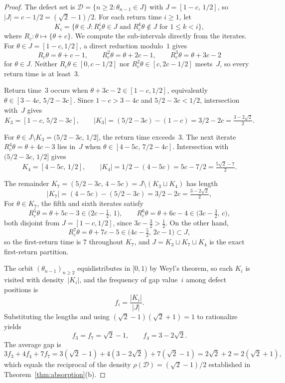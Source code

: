 \documentclass{birkjour}
\theoremstyle{definition}
\theoremstyle{remark}
\newcommand{\frc}[1]{\{ #1 \}}
\begin{document}
\begin{proof}
The defect set is
$\mathcal{D}=\{n\ge 2:\theta_{n-1}\in J\}$ with
$J=[1-c,\,1/2]$, so $|J|=c-1/2=(\sqrt{2}-1)/2$.
For each return time $i\ge 1$, let
\[
  K_{i}=\{\theta\in J: R_{c}^{i}\theta\in J
  \text{ and } R_{c}^{k}\theta\notin J
  \text{ for }1\le k<i\},
\]
where $R_{c}\colon\theta\mapsto\frc{\theta+c}$.
We compute the sub-intervals directly from the
iterates. For $\theta\in J=[1-c,1/2]$, a direct reduction
modulo~$1$ gives
\[
  R_{c}\theta=\theta+c-1,\qquad
  R_{c}^{2}\theta=\theta+2c-1,\qquad
  R_{c}^{3}\theta=\theta+3c-2
\]
for $\theta\in J$. Neither $R_{c}\theta\in[0,c-1/2]$
nor $R_{c}^{2}\theta\in[c,2c-1/2]$ meets~$J$, so
every return time is at least~$3$.

Return time~$3$ occurs when
$\theta+3c-2\in[1-c,1/2]$, equivalently
$\theta\in[3-4c,\,5/2-3c]$. Since $1-c>3-4c$
and $5/2-3c<1/2$, intersection with~$J$ gives
\[
  K_{3}=[1-c,\,5/2-3c],\qquad
  |K_{3}|=(5/2-3c)-(1-c)=3/2-2c=\tfrac{3-2\sqrt{2}}{2}.
\]

For $\theta\in J\setminus K_{3}=(5/2-3c,\,1/2]$, the
return time exceeds~$3$. The next iterate
$R_{c}^{4}\theta=\theta+4c-3$ lies in~$J$ when
$\theta\in[4-5c,\,7/2-4c]$. Intersection with
$(5/2-3c,\,1/2]$ gives
\[
  K_{4}=[4-5c,\,1/2],\qquad
  |K_{4}|=1/2-(4-5c)=5c-7/2=\tfrac{5\sqrt{2}-7}{2}.
\]

The remainder
$K_{7}=(5/2-3c,\,4-5c)=J\setminus(K_{3}\sqcup K_{4})$
has length
\[
  |K_{7}|=(4-5c)-(5/2-3c)=3/2-2c=\tfrac{3-2\sqrt{2}}{2},
\]
For $\theta\in K_{7}$, the fifth and sixth iterates satisfy
\[
  R_{c}^{5}\theta=\theta+5c-3\in\bigl(2c-\tfrac12,\,1\bigr),
  \qquad
  R_{c}^{6}\theta=\theta+6c-4\in\bigl(3c-\tfrac32,\,c\bigr),
\]
both disjoint from $J=[1-c,1/2]$, since $3c-\tfrac32>\tfrac12$.
On the other hand,
\[
  R_{c}^{7}\theta=\theta+7c-5\in\bigl(4c-\tfrac52,\,2c-1\bigr)
  \subset J,
\]
so the first-return time is $7$ throughout $K_{7}$, and
$J=K_{3}\sqcup K_{7}\sqcup K_{4}$ is the exact first-return
partition.

The orbit $(\theta_{n-1})_{n\ge 2}$ equidistributes
in $[0,1)$ by Weyl's theorem, so each $K_{i}$ is
visited with density~$|K_{i}|$, and the frequency
of gap value~$i$ among defect positions is
\[
  f_{i}=\frac{|K_{i}|}{|J|}.
\]
Substituting the lengths and using
$(\sqrt{2}-1)(\sqrt{2}+1)=1$ to rationalize yields
\[
  f_{3}=f_{7}=\sqrt{2}-1,\qquad
  f_{4}=3-2\sqrt{2}.
\]
The average gap is
\[
  3f_{3}+4f_{4}+7f_{7}
  =3(\sqrt{2}{-}1)+4(3{-}2\sqrt{2})+7(\sqrt{2}{-}1)
  =2\sqrt{2}+2
  =2(\sqrt{2}{+}1),
\]
which equals the reciprocal of the density
$\rho(\mathcal{D})=(\sqrt{2}-1)/2$ established in
Theorem~\ref{thm:absorption}(b).
\end{proof}
\end{document}
